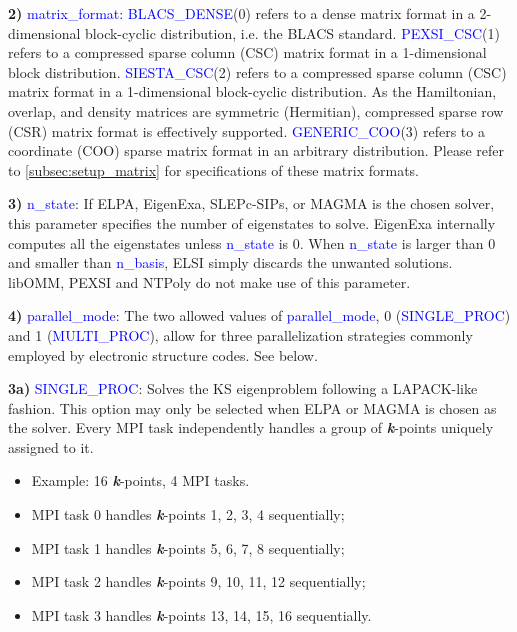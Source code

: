 \documentclass{report}
\begin{document}
\textbf{2)} \textcolor{blue}{matrix\_format}: \textcolor{blue}{BLACS\_DENSE}(0) refers to a dense matrix format in a 2-dimensional block-cyclic distribution, i.e. the BLACS standard. \textcolor{blue}{PEXSI\_CSC}(1) refers to a compressed sparse column (CSC) matrix format in a 1-dimensional block distribution. \textcolor{blue}{SIESTA\_CSC}(2) refers to a compressed sparse column (CSC) matrix format in a 1-dimensional block-cyclic distribution. As the Hamiltonian, overlap, and density matrices are symmetric (Hermitian), compressed sparse row (CSR) matrix format is effectively supported. \textcolor{blue}{GENERIC\_COO}(3) refers to a coordinate (COO) sparse matrix format in an arbitrary distribution. Please refer to \ref{subsec:setup_matrix} for specifications of these matrix formats.

\textbf{3)} \textcolor{blue}{n\_state}: If ELPA, EigenExa, SLEPc-SIPs, or MAGMA is the chosen solver, this parameter specifies the number of eigenstates to solve. EigenExa internally computes all the eigenstates unless \textcolor{blue}{n\_state} is 0. When \textcolor{blue}{n\_state} is larger than 0 and smaller than \textcolor{blue}{n\_basis}, ELSI simply discards the unwanted solutions. libOMM, PEXSI and NTPoly do not make use of this parameter.

\textbf{4)} \textcolor{blue}{parallel\_mode}: The two allowed values of \textcolor{blue}{parallel\_mode}, 0 (\textcolor{blue}{SINGLE\_PROC}) and 1 (\textcolor{blue}{MULTI\_PROC}), allow for three parallelization strategies commonly employed by electronic structure codes. See below.

\textbf{3a)} \textcolor{blue}{SINGLE\_PROC}: Solves the KS eigenproblem following a LAPACK-like fashion. This option may only be selected when ELPA or MAGMA is chosen as the solver. Every MPI task independently handles a group of \textbf{\textit{k}}-points uniquely assigned to it.
\begin{itemize}
\item Example: 16 \textbf{\textit{k}}-points, 4 MPI tasks.
\item MPI task 0 handles \textbf{\textit{k}}-points 1, 2, 3, 4 sequentially;
\item MPI task 1 handles \textbf{\textit{k}}-points 5, 6, 7, 8 sequentially;
\item MPI task 2 handles \textbf{\textit{k}}-points 9, 10, 11, 12 sequentially;
\item MPI task 3 handles \textbf{\textit{k}}-points 13, 14, 15, 16 sequentially.
\end{itemize}
\end{document}
